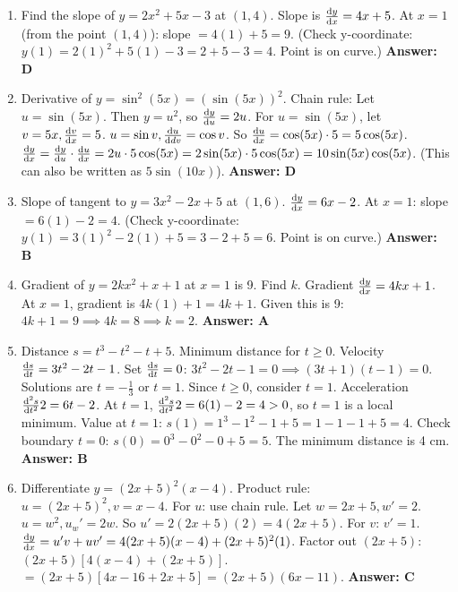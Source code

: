 \begin{enumerate}[label={\arabic*.}]
  \item Find the slope of \(y = 2x^2 + 5x - 3\) at \((1,4)\).
    Slope is \(\frac{\mathrm{d}y}{\mathrm{d}x} = 4x + 5\).
    At \(x=1\) (from the point \((1,4)\)): slope \(= 4(1) + 5 = 9\).
    (Check y-coordinate: \(y(1) = 2(1)^2+5(1)-3 = 2+5-3=4\). Point is on curve.)
    \textbf{Answer: D}

  \item Derivative of \(y = \sin^2(5x) = (\sin(5x))^2\).
    Chain rule: Let \(u = \sin(5x)\). Then \(y=u^2\), so \(\frac{\mathrm{d}y}{\mathrm{d}u}=2u\).
    For \(u=\sin(5x)\), let \(v=5x, \frac{\mathrm{d}v}{\mathrm{d}x}=5\). \(u=\sin v, \frac{\mathrm{d}u}{\mathrm{d}dv}=\cos v\).
    So \(\frac{\mathrm{d}u}{\mathrm{d}x} = \cos(5x) \cdot 5 = 5\cos(5x)\).
    \(\frac{\mathrm{d}y}{\mathrm{d}x} = \frac{\mathrm{d}y}{\mathrm{d}u} \cdot \frac{\mathrm{d}u}{\mathrm{d}x} = 2u \cdot 5\cos(5x) = 2\sin(5x) \cdot 5\cos(5x) = 10\sin(5x)\cos(5x)\).
    (This can also be written as \(5\sin(10x)\)).
    \textbf{Answer: D}

  \item Slope of tangent to \(y = 3x^2 - 2x + 5\) at \((1,6)\).
    \(\frac{\mathrm{d}y}{\mathrm{d}x} = 6x - 2\).
    At \(x=1\): slope \(= 6(1) - 2 = 4\).
    (Check y-coordinate: \(y(1) = 3(1)^2-2(1)+5 = 3-2+5=6\). Point is on curve.)
    \textbf{Answer: B}

  \item Gradient of \(y = 2kx^2 + x + 1\) at \(x=1\) is 9. Find \(k\).
    Gradient \(\frac{\mathrm{d}y}{\mathrm{d}x} = 4kx + 1\).
    At \(x=1\), gradient is \(4k(1) + 1 = 4k+1\).
    Given this is 9: \(4k+1 = 9 \implies 4k = 8 \implies k=2\).
    \textbf{Answer: A}

  \item Distance \(s = t^3 - t^2 - t + 5\). Minimum distance for \(t \ge 0\).
    Velocity \(\frac{\mathrm{d}s}{\mathrm{d}t} = 3t^2 - 2t - 1\).
    Set \(\frac{\mathrm{d}s}{\mathrm{d}t}=0\): \(3t^2 - 2t - 1 = 0 \implies (3t+1)(t-1)=0\).
    Solutions are \(t = -\frac{1}{3}\) or \(t=1\). Since \(t \ge 0\), consider \(t=1\).
    Acceleration \(\frac{\mathrm{d}^2 s}{\mathrm{d} t^2}{2} = 6t - 2\).
    At \(t=1\), \(\frac{\mathrm{d}^2 s}{\mathrm{d} t^2}{2} = 6(1)-2 = 4 > 0\), so \(t=1\) is a local minimum.
    Value at \(t=1\): \(s(1) = 1^3 - 1^2 - 1 + 5 = 1-1-1+5 = 4\).
    Check boundary \(t=0\): \(s(0) = 0^3 - 0^2 - 0 + 5 = 5\).
    The minimum distance is 4 cm.
    \textbf{Answer: B}

  \item Differentiate \(y = (2x+5)^2(x-4)\).
    Product rule: \(u=(2x+5)^2, v=x-4\).
    For \(u\): use chain rule. Let \(w=2x+5, w'=2\). \(u=w^2, u_w'=2w\). So \(u' = 2(2x+5)(2) = 4(2x+5)\).
    For \(v\): \(v'=1\).
    \(\frac{\mathrm{d}y}{\mathrm{d}x} = u'v + uv' = 4(2x+5)(x-4) + (2x+5)^2(1)\).
    Factor out \((2x+5)\): \((2x+5)[4(x-4) + (2x+5)]\).
    \(= (2x+5)[4x - 16 + 2x + 5] = (2x+5)(6x - 11)\).
    \textbf{Answer: C}


\end{enumerate}
